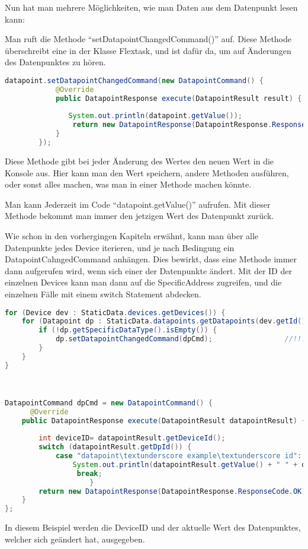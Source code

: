 Nun hat man mehrere Möglichkeiten, wie man Daten aus dem Datenpunkt lesen kann:
\begin{compactenum}
    \item Man ruft die Methode “setDatapointChangedCommand()” auf. Diese Methode überschreibt eine in der Klasse Flextask, und ist dafür da, um auf Änderungen des Datenpunktes zu hören.
    \begin{lstlisting}[language=java,caption=Example catapoint usage,label=lst:impl:foo]
        datapoint.setDatapointChangedCommand(new DatapointCommand() { 
            @Override 
            public DatapointResponse execute(DatapointResult result) { 
         
               System.out.println(datapoint.getValue()); 
                return new DatapointResponse(DatapointResponse.ResponseCode.OK); 
            } 
        }); 
    \end{lstlisting}
    Diese Methode gibt bei jeder Änderung des Wertes den neuen Wert in die Konsole aus. Hier kann man den Wert speichern, andere Methoden ausführen, oder sonst alles machen, was man in einer Methode machen könnte.

    \item Man kann Jederzeit im Code “datapoint.getValue()” aufrufen. Mit dieser Methode bekommt man immer den jetzigen Wert des Datenpunkt zurück.
    \item Wie schon in den vorhergingen Kapiteln erwähnt, kann man über alle Datenpunkte jedes Device iterieren, und je nach Bedingung ein DatapointCahngedCommand anhängen. Dies bewirkt, dass eine Methode immer dann aufgerufen wird, wenn sich einer der Datenpunkte ändert. Mit der ID der einzelnen Devices kann man dann auf die SpecificAddress zugreifen, und die einzelnen Fälle mit einem switch Statement abdecken.
    \begin{lstlisting}[language=java,caption=Example multible datapoint usage,label=lst:impl:foo]
        for (Device dev : StaticData.devices.getDevices()) { 
    for (Datapoint dp : StaticData.datapoints.getDatapoints(dev.getId())) { 
        if (!dp.getSpecificDataType().isEmpty()) { 
            dp.setDatapointChangedCommand(dpCmd);                 //!!! 
        } 
    } 
} 

 

DatapointCommand dpCmd = new DatapointCommand() { 
      @Override 
    public DatapointResponse execute(DatapointResult datapointResult) { 
 
        int deviceID= datapointResult.getDeviceId();  
        switch (datapointResult.getDpId()) { 
            case "datapoint\textunderscore example\textunderscore id": 
                System.out.println(datapointResult.getValue() + " " + deviceID ); 
                 break; 
                    } 
        return new DatapointResponse(DatapointResponse.ResponseCode.OK); 
    } 
}; 

    \end{lstlisting}
    In diesem Beispiel werden die DeviceID und der aktuelle Wert des Datenpunktes, welcher sich geändert hat, ausgegeben.
\end{compactenum}

